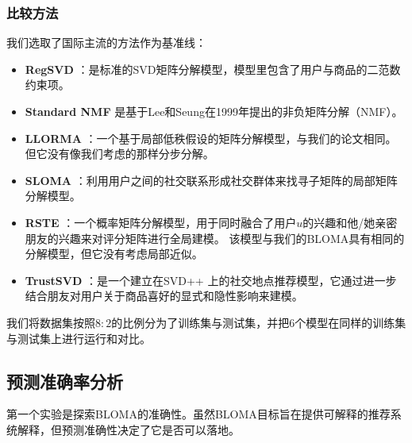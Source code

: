 \subsubsection{比较方法}
我们选取了国际主流的方法作为基准线：
\begin{itemize}
\item \textbf{RegSVD} ：是标准的SVD矩阵分解模型，模型里包含了用户与商品的二范数约束项。
\item \textbf{Standard NMF} 是基于Lee和Seung在1999年提出的非负矩阵分解（NMF）。
\item \textbf{LLORMA} ：一个基于局部低秩假设的矩阵分解模型，与我们的论文相同。但它没有像我们考虑的那样分步分解。

\item \textbf{SLOMA} ：利用用户之间的社交联系形成社交群体来找寻子矩阵的局部矩阵分解模型。

\item \textbf{RSTE} ：一个概率矩阵分解模型，用于同时融合了用户$u$的兴趣和他/她亲密朋友的兴趣来对评分矩阵进行全局建模。 该模型与我们的BLOMA具有相同的分解模型，但它没有考虑局部近似。
\item \textbf{TrustSVD} ：是一个建立在SVD++ 上的社交地点推荐模型，它通过进一步结合朋友对用户关于商品喜好的显式和隐性影响来建模。
\end{itemize}
我们将数据集按照$8:2$的比例分为了训练集与测试集，并把6个模型在同样的训练集与测试集上进行运行和对比。

\subsection{预测准确率分析}
第一个实验是探索BLOMA的准确性。虽然BLOMA目标旨在提供可解释的推荐系统解释，但预测准确性决定了它是否可以落地。

